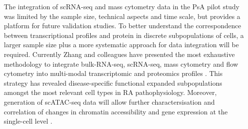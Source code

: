 The integration of scRNA-seq and mass cytometry data in the PsA pilot study was limited by the sample size, technical aspects and time scale, but provides a platform for future validation studies. To better understand the correspondence between transcriptional profiles and protein in discrete subpopulations of cells, a larger sample size plus a more systematic approach for data integration will be required. Currently Zhang and colleagues have presented the most exhaustive methodology to integrate bulk-RNA-seq, scRNA-seq, mass cytometry and flow cytometry into multi-modal transcriptomic and proteomics profiles \parencite{Zhang2018}. This strategy has revealed disease-specific functional expanded subpopulations amongst the most relevant cell types in RA pathophysiology. Moreover, generation of scATAC-seq data will allow further charactersisation and correlation of changes in chromatin accessibility and gene expression at the single-cell level \parencite{Duren2018}.

